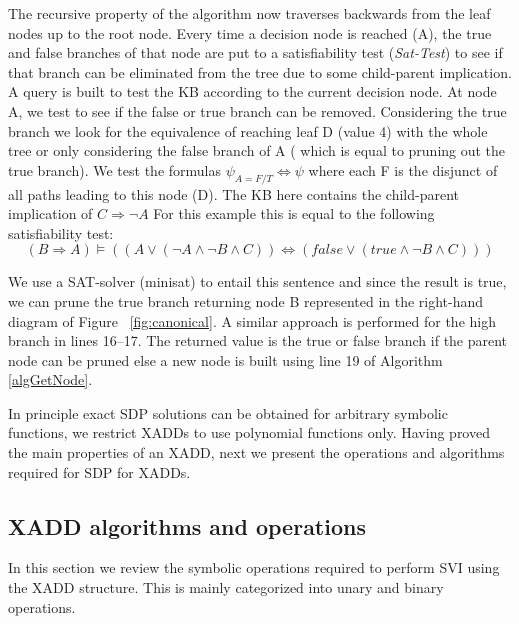 \documentclass[twoside,11pt]{article}
\begin{document}
The recursive property of the algorithm now traverses backwards from the leaf nodes up to the root node. Every time a decision node is reached (A), the true and false branches of that node are put to a satisfiability test (\emph{Sat-Test}) to see if that branch can be eliminated from the tree due to some child-parent implication. A query is built to test the KB according to the current decision node. At node A, we test to see if the false or true branch can be removed. Considering the true branch we look for the equivalence of reaching leaf D (value 4) with the whole tree or only considering the false branch of A ( which is equal to pruning out the true branch). We test the formulas $\psi_{A=F/T} \Longleftrightarrow \psi$ where each F is the disjunct of all paths leading to this node (D). The KB here contains the child-parent implication of $C \Rightarrow \neg A$ For this example this is equal to the following satisfiability test: 
\begin{equation*}
(B \Rightarrow A) \models ((A \vee (\neg A \wedge \neg B \wedge C))\Longleftrightarrow(\mathit{false} \vee (\mathit{true} \wedge \neg B \wedge C)))
\end{equation*}

We use a SAT-solver (minisat) to entail this sentence and since the result is true, we can prune the true branch returning node B represented in the right-hand diagram of  Figure ~\ref{fig:canonical}. A similar approach is performed for the high branch in lines 16--17. The returned value is the true or false branch if the parent node can be pruned else a new node is built using line 19 of Algorithm \ref{algGetNode}. 

In principle exact SDP solutions can be obtained for arbitrary symbolic functions, we  restrict XADDs to use polynomial functions only. %
Having proved the main properties of an XADD, next we present the operations and algorithms required for SDP for XADDs.

\subsection{XADD algorithms and operations}

In this section we review the symbolic operations required to perform SVI using the XADD structure. This is mainly categorized into unary and binary operations.   
\end{document}
